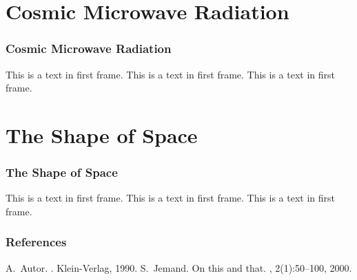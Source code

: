 \documentclass[13pt]{beamer}
\begin{document}
\section{Cosmic Microwave Radiation} %
\begin{frame}
\frametitle{Cosmic Microwave Radiation}
This is a text in first frame. This is a text in first frame. This is a text in first frame.
\end{frame}

\section{The Shape of Space} %
\begin{frame}
\frametitle{The Shape of Space}
This is a text in first frame. This is a text in first frame. This is a text in first frame.
\end{frame}

 \begin{frame}[allowframebreaks]
  \frametitle{References}    
  \begin{thebibliography}{10}    
  \beamertemplatebookbibitems
    A.~Autor.
    .
    \newblock Klein-Verlag, 1990.
  \beamertemplatearticlebibitems
    S.~Jemand.
    \newblock On this and that.
    , 2(1):50--100, 2000.
  \end{thebibliography}
\end{frame}
\end{document}
